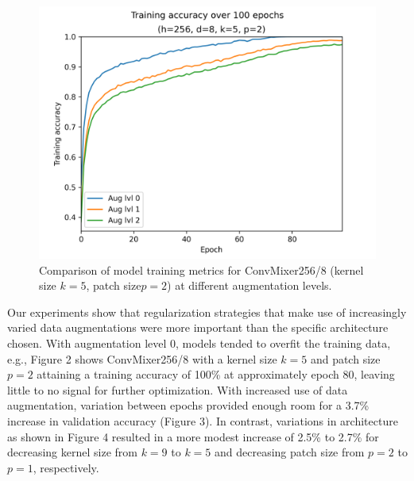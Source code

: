 \documentclass[letterpaper]{article} %
\begin{document}
\begin{figure}
    \includegraphics[width=\linewidth]{training_k5p2.png}
    \caption{Comparison of model training metrics for ConvMixer256/8 (kernel size $k=5$, patch size$p=2$) at different augmentation levels.}
  \end{figure}

Our experiments show that regularization strategies that make use of increasingly varied data augmentations were more important than the specific architecture chosen. With augmentation level 0, models tended to overfit the training data, e.g., Figure 2 shows ConvMixer256/8 with a kernel size $k=5$ and patch size $p=2$ attaining a training accuracy of 100\% at approximately epoch 80, leaving little to no signal for further optimization. With increased use of data augmentation, variation between epochs provided enough room for a 3.7\% increase in validation accuracy (Figure 3). In contrast, variations in architecture as shown in Figure 4 resulted in a more modest increase of 2.5\% to 2.7\% for decreasing kernel size from $k=9$ to $k=5$ and decreasing patch size from $p=2$ to $p=1$, respectively.
\end{document}
